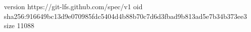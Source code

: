 version https://git-lfs.github.com/spec/v1
oid sha256:916649bc13d9e070985fdc5404d4b88b70c7d6d3fbad9b813ad5e7b34b373ee3
size 11088
